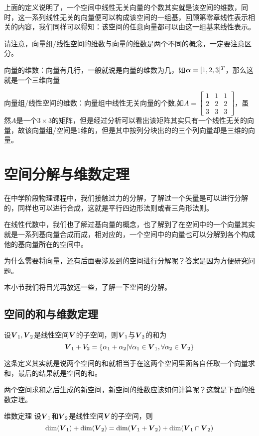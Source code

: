 \documentclass[12pt, a4paper, oneside, UTF8]{ctexbook}
\begin{document}
上面的定义说明了，一个空间中线性无关向量的个数其实就是该空间的维数，同时，这一系列线性无关的向量便可以构成该空间的一组基，回顾第零章线性表示相关的内容，我们同样可以得知：该空间的任意向量都可以由这一组基来线性表示。
\newpage
\begin{rmk}
    请注意，向量组/线性空间的维数与向量的维数是两个不同的概念，一定要注意区分。

    向量的维数：向量有几行，一般就说是向量的维数为几，如$\boldsymbol{\alpha}=[1,2,3]^T$，那么这就是一个三维向量

    向量组/线性空间的维数：向量组中线性无关向量的个数,如$A=\begin{bmatrix}
        1&1&1\\
        2&2&2\\
        3&3&3
    \end{bmatrix}$，虽然$A$是一个$3\times 3$的矩阵，但是经过分析可以看出该矩阵其实只有一个线性无关的向量，故该向量组/空间是1维的，但是其中按列分块出的的三个列向量却是三维的向量。
\end{rmk}

\section{空间分解与维数定理}
在中学阶段物理课程中，我们接触过力的分解，了解过一个矢量是可以进行分解的，同样也可以进行合成，这就是平行四边形法则或者三角形法则。

在线性代数中，我们也了解过基向量的概念，也了解到了在空间中的一个向量其实就是一系列基向量合成而成，相对应的，一个空间中的向量也可以分解到各个构成他的基向量所在的空间中。

为什么需要将向量，还有后面要涉及到的空间进行分解呢？答案是因为方便研究问题。

本小节我们将目光再放远一些，了解一下空间的分解。

\subsection{空间的和与维数定理}
\begin{defn}{}{}
    设$\boldsymbol{V}_1,\boldsymbol{V}_2$是线性空间$\boldsymbol{V}$的子空间，则$\boldsymbol{V}_1$与$\boldsymbol{V}_2$的和为\[\boldsymbol{V}_1+V_2=\{\alpha_1+\alpha_2|\forall \alpha_1\in\boldsymbol{V}_1,\forall\alpha_2\in\boldsymbol{V}_2\}\]
\end{defn}
这条定义其实就是说两个空间的和就相当于在这两个空间里面各自任取一个向量求和，最后的结果就是空间的和。

两个空间求和之后生成的新空间，新空间的维数应该如何计算呢？这就是下面的维数定理。
\begin{them}{维数定理}{}
    设$\boldsymbol{V}_1$和$\boldsymbol{V}_2$是线性空间$\boldsymbol{V}$的子空间，则\[\dim(\boldsymbol{V}_1)+\dim(\boldsymbol{V}_2)=\dim(\boldsymbol{V}_1+\boldsymbol{V}_2)+\dim(\boldsymbol{V}_1\cap\boldsymbol{V}_2)\]
\end{them}
\end{document}
